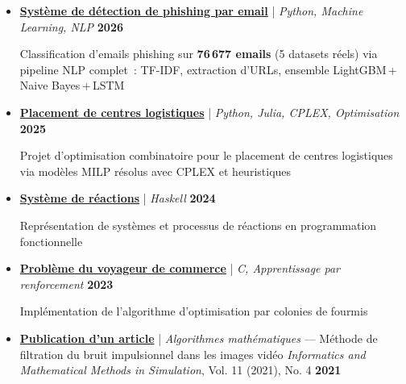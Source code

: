 \documentclass[10pt,english,french]{article}
\begin{document}
\vspace{-4pt}
\begin{itemize}[leftmargin=0.5cm, label=\textbullet, itemsep=0.2em]
    \item \href{https://github.com/DmytroPalahin/phishing-email-detection}{\textbf{Système de détection de phishing par email}} | \textit{Python, Machine Learning, NLP} \hfill \textbf{2026}

          Classification d'emails phishing sur \textbf{76\,677 emails} (5 datasets réels) via
          pipeline NLP complet~: TF-IDF, extraction d'URLs, ensemble LightGBM\,+\,Naive Bayes\,+\,LSTM

    \item \href{https://github.com/DmytroPalahin/logistics-center-placement}{\textbf{Placement de centres logistiques}} | \textit{Python, Julia, CPLEX, Optimisation} \hfill \textbf{2025}

          Projet d’optimisation combinatoire pour le placement de centres logistiques via
          modèles MILP résolus avec CPLEX et heuristiques

    \item \href{https://github.com/DmytroPalahin/hsReact}{\textbf{Système de réactions}} | \textit{Haskell} \hfill \textbf{2024}

          Représentation de systèmes et processus de réactions en programmation
          fonctionnelle

    \item \href{https://github.com/DmytroPalahin/Probleme_du_Voyageur_de_Commerce}{\textbf{Problème du voyageur de commerce}} | \textit{C, Apprentissage par renforcement} \hfill \textbf{2023}

          Implémentation de l'algorithme d'optimisation par colonies de fourmis

    \item \href{https://www.researchsquare.com/article/rs-2203260/v1}{\textbf{Publication d'un article}} | \textit{Algorithmes mathématiques} --- Méthode de filtration du bruit impulsionnel dans les images vidéo \textit{Informatics and Mathematical Methods in Simulation}, Vol. 11 (2021), No. 4 \hfill \textbf{2021}


\end{itemize}
\end{document}
